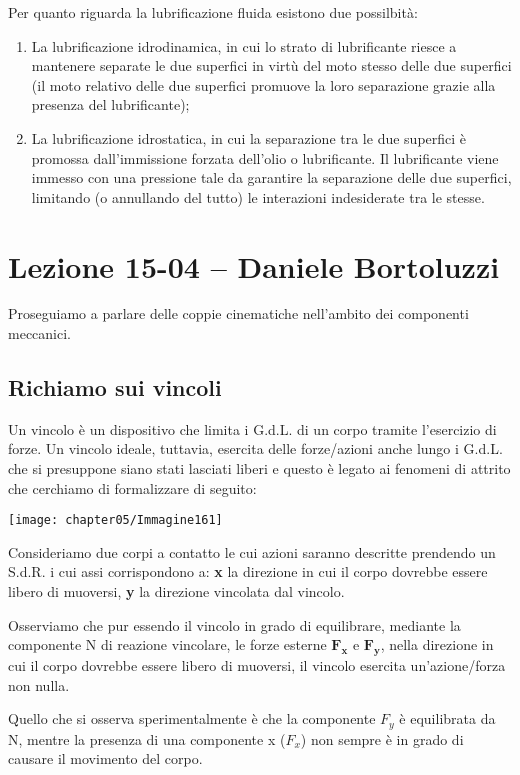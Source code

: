 \begin{enumerate}
Per quanto riguarda la lubrificazione fluida esistono due possilbità:
\begin{enumerate}
\item La lubrificazione idrodinamica, in cui lo strato di lubrificante riesce a mantenere separate le due superfici in virtù del moto stesso delle due superfici (il moto relativo delle due superfici promuove la loro separazione grazie alla presenza del lubrificante); 
\item La lubrificazione idrostatica, in cui la separazione tra le due superfici è promossa dall'immissione forzata dell'olio o lubrificante. Il lubrificante viene immesso con una pressione tale da garantire la separazione delle due superfici, limitando (o annullando del tutto) le interazioni indesiderate tra le stesse.
\end{enumerate}
\end{enumerate}

\section{Lezione 15-04 -- Daniele Bortoluzzi}

Proseguiamo a parlare delle coppie cinematiche nell'ambito dei componenti meccanici.

\subsection{Richiamo sui vincoli}

Un vincolo è un dispositivo che limita i G.d.L. di un corpo tramite l'esercizio di forze. Un vincolo ideale, tuttavia, esercita delle forze/azioni anche lungo i G.d.L. che si presuppone siano stati lasciati liberi e questo è legato ai fenomeni di attrito che cerchiamo di formalizzare di seguito:
\vspace{1mm}

\begin{minipage}{.5\textwidth}
\centering
\texttt{[image: chapter05/Immagine161]}
\end{minipage}
\hfill
\begin{minipage}{.5\textwidth}
Consideriamo due corpi a contatto le cui azioni saranno descritte prendendo un S.d.R. i cui assi corrispondono a: \textbf{x} la direzione in cui il corpo dovrebbe essere libero di muoversi, \textbf{y} la direzione vincolata dal vincolo.

Osserviamo che pur essendo il vincolo in grado di equilibrare, mediante la componente N di reazione vincolare, le forze esterne	$\mathbf{F_x}$ e $\mathbf{F_y}$, nella direzione in cui il corpo dovrebbe essere libero di muoversi, il vincolo esercita un'azione/forza non nulla.\newline

Quello che si osserva sperimentalmente è che la componente $F_y$ è equilibrata da N, mentre la presenza di una componente x ($F_x$) non sempre è in grado di causare il movimento del corpo. 
\end{minipage}

